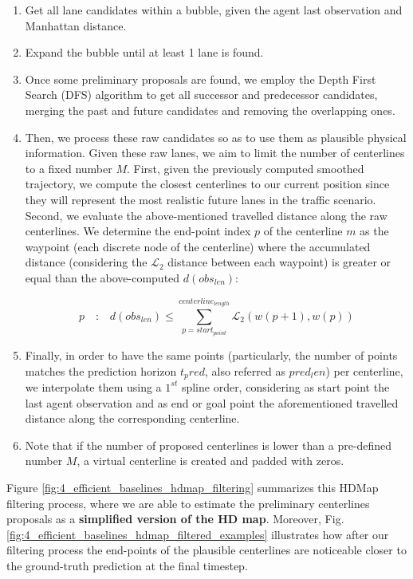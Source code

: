 \begin{enumerate}
	\item Get all lane candidates within a bubble, given the agent last observation and Manhattan distance.
	
	\item Expand the bubble until at least 1 lane is found.
	
	\item Once some preliminary proposals are found, we employ the Depth First Search (DFS) algorithm to get all successor and predecessor candidates, merging the past and future candidates and removing the overlapping ones.
	
	\item Then, we process these raw candidates so as to use them as plausible physical information. Given these raw lanes, we aim to limit the number of centerlines to a fixed number $M$. First, given the previously computed smoothed trajectory, we compute the closest centerlines to our current position since they will represent the most realistic future lanes in the traffic scenario. Second, we evaluate the above-mentioned travelled distance along the raw centerlines. We determine the end-point index $p$ of the centerline $m$ as the waypoint (each discrete node of the centerline) where the accumulated distance (considering the $\mathcal{L}_2$ distance between each waypoint) is greater or equal than the above-computed $d(obs_{len})$:
	
	\begin{equation}
		p \quad \textbf{:} \quad d(obs_{len}) \leq \sum_{p=start_{point}}^{centerline_{length}} \mathcal{L}_2(w(p+1),w(p))
	\end{equation}

	\item Finally, in order to have the same points (particularly, the number of points matches the prediction horizon $t_pred$, also referred as $pred_len$) per centerline, we interpolate them using a $1^{st}$ spline order, considering as start point the last agent observation and as end or goal point the aforementioned travelled distance along the corresponding centerline.
	
	\item Note that if the number of proposed centerlines is lower than a pre-defined number $M$, a virtual centerline is created and padded with zeros.
\end{enumerate}

Figure \ref{fig:4_efficient_baselines_hdmap_filtering} summarizes this HDMap filtering process, where we are able to estimate the preliminary centerlines proposals as a \textbf{simplified version of the HD map}. Moreover, Fig. \ref{fig:4_efficient_baselines_hdmap_filtered_examples} illustrates how after our filtering process the end-points of the plausible centerlines are noticeable closer to the ground-truth prediction at the final timestep. 

